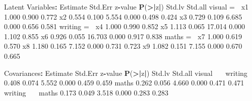 \documentclass[]{article}
\newenvironment{Shaded}{\begin{snugshade}}{\end{snugshade}}
\newcommand{\ErrorTok}[1]{\textcolor[rgb]{0.64,0.00,0.00}{\textbf{#1}}}
\newcommand{\FloatTok}[1]{\textcolor[rgb]{0.00,0.00,0.81}{#1}}
\newcommand{\KeywordTok}[1]{\textcolor[rgb]{0.13,0.29,0.53}{\textbf{#1}}}
\newcommand{\NormalTok}[1]{#1}
\newcommand{\OperatorTok}[1]{\textcolor[rgb]{0.81,0.36,0.00}{\textbf{#1}}}
\newcommand{\StringTok}[1]{\textcolor[rgb]{0.31,0.60,0.02}{#1}}
\begin{document}
\begin{Shaded}
\begin{Highlighting}[]
\NormalTok{Latent Variables}\OperatorTok{:}
\StringTok{                   }\NormalTok{Estimate  Std.Err  z}\OperatorTok{-}\NormalTok{value  }\KeywordTok{P}\NormalTok{(}\OperatorTok{>}\ErrorTok{|}\NormalTok{z}\OperatorTok{|}\NormalTok{)   Std.lv  Std.all}
\NormalTok{  visual =}\ErrorTok{~}\StringTok{                                                             }
\StringTok{    }\NormalTok{x1                }\FloatTok{1.000}                               \FloatTok{0.900}    \FloatTok{0.772}
\NormalTok{    x2                }\FloatTok{0.554}    \FloatTok{0.100}    \FloatTok{5.554}    \FloatTok{0.000}    \FloatTok{0.498}    \FloatTok{0.424}
\NormalTok{    x3                }\FloatTok{0.729}    \FloatTok{0.109}    \FloatTok{6.685}    \FloatTok{0.000}    \FloatTok{0.656}    \FloatTok{0.581}
\NormalTok{  writing =}\ErrorTok{~}\StringTok{                                                            }
\StringTok{    }\NormalTok{x4                }\FloatTok{1.000}                               \FloatTok{0.990}    \FloatTok{0.852}
\NormalTok{    x5                }\FloatTok{1.113}    \FloatTok{0.065}   \FloatTok{17.014}    \FloatTok{0.000}    \FloatTok{1.102}    \FloatTok{0.855}
\NormalTok{    x6                }\FloatTok{0.926}    \FloatTok{0.055}   \FloatTok{16.703}    \FloatTok{0.000}    \FloatTok{0.917}    \FloatTok{0.838}
\NormalTok{  maths =}\ErrorTok{~}\StringTok{                                                              }
\StringTok{    }\NormalTok{x7                }\FloatTok{1.000}                               \FloatTok{0.619}    \FloatTok{0.570}
\NormalTok{    x8                }\FloatTok{1.180}    \FloatTok{0.165}    \FloatTok{7.152}    \FloatTok{0.000}    \FloatTok{0.731}    \FloatTok{0.723}
\NormalTok{    x9                }\FloatTok{1.082}    \FloatTok{0.151}    \FloatTok{7.155}    \FloatTok{0.000}    \FloatTok{0.670}    \FloatTok{0.665}

\NormalTok{Covariances}\OperatorTok{:}
\StringTok{                   }\NormalTok{Estimate  Std.Err  z}\OperatorTok{-}\NormalTok{value  }\KeywordTok{P}\NormalTok{(}\OperatorTok{>}\ErrorTok{|}\NormalTok{z}\OperatorTok{|}\NormalTok{)   Std.lv  Std.all}
\NormalTok{  visual }\OperatorTok{~}\ErrorTok{~}\StringTok{                                                             }
\StringTok{    }\NormalTok{writing           }\FloatTok{0.408}    \FloatTok{0.074}    \FloatTok{5.552}    \FloatTok{0.000}    \FloatTok{0.459}    \FloatTok{0.459}
\NormalTok{    maths             }\FloatTok{0.262}    \FloatTok{0.056}    \FloatTok{4.660}    \FloatTok{0.000}    \FloatTok{0.471}    \FloatTok{0.471}
\NormalTok{  writing }\OperatorTok{~}\ErrorTok{~}\StringTok{                                                            }
\StringTok{    }\NormalTok{maths             }\FloatTok{0.173}    \FloatTok{0.049}    \FloatTok{3.518}    \FloatTok{0.000}    \FloatTok{0.283}    \FloatTok{0.283}


\end{Highlighting}
\end{Shaded}
\end{document}

